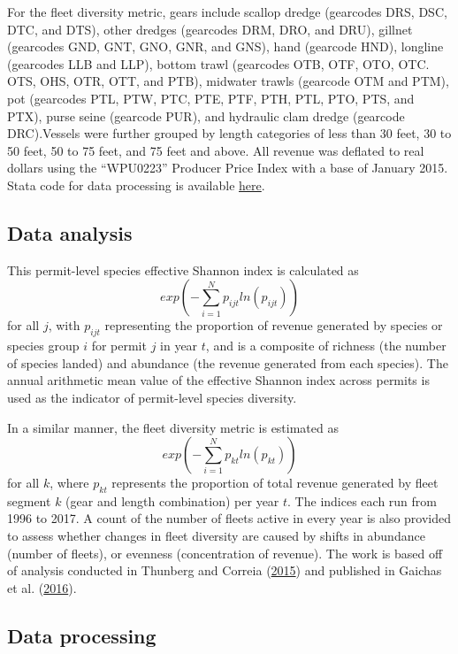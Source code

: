 \documentclass[
]{book}
\begin{document}
For the fleet diversity metric, gears include scallop dredge (gearcodes DRS, DSC, DTC, and DTS), other dredges (gearcodes DRM, DRO, and DRU), gillnet (gearcodes GND, GNT, GNO, GNR, and GNS), hand (gearcode HND), longline (gearcodes LLB and LLP), bottom trawl (gearcodes OTB, OTF, OTO, OTC. OTS, OHS, OTR, OTT, and PTB), midwater trawls (gearcode OTM and PTM), pot (gearcodes PTL, PTW, PTC, PTE, PTF, PTH, PTL, PTO, PTS, and PTX), purse seine (gearcode PUR), and hydraulic clam dredge (gearcode DRC).Vessels were further grouped by length categories of less than 30 feet, 30 to 50 feet, 50 to 75 feet, and 75 feet and above. All revenue was deflated to real dollars using the ``WPU0223'' Producer Price Index with a base of January 2015. Stata code for data processing is available \href{https://github.com/NOAA-EDAB/tech-doc/tree/master/data/Human_Dimensions_code}{here}.

\hypertarget{data-analysis-4}{%
\subsection{Data analysis}\label{data-analysis-4}}

This permit-level species effective Shannon index is calculated as
\[exp(-\sum_{i=1}^{N}p_{ijt}ln(p_{ijt}))\]
for all \(j\), with \(p_{ijt}\) representing the proportion of revenue generated by species or species group \(i\) for permit \(j\) in year \(t\), and is a composite of richness (the number of species landed) and abundance (the revenue generated from each species). The annual arithmetic mean value of the effective Shannon index across permits is used as the indicator of permit-level species diversity.

In a similar manner, the fleet diversity metric is estimated as
\[exp(-\sum_{i=1}^{N}p_{kt}ln(p_{kt})) \]
for all \(k\), where \(p_{kt}\) represents the proportion of total revenue generated by fleet segment \(k\) (gear and length combination) per year \(t\). The indices each run from 1996 to 2017. A count of the number of fleets active in every year is also provided to assess whether changes in fleet diversity are caused by shifts in abundance (number of fleets), or evenness (concentration of revenue). The work is based off of analysis conducted in Thunberg and Correia (\protect\hyperlink{ref-eric_m_thunberg_measures_2015}{2015}) and published in Gaichas et al. (\protect\hyperlink{ref-gaichas_framework_2016}{2016}).

\hypertarget{data-processing-3}{%
\subsection{Data processing}\label{data-processing-3}}
\end{document}
